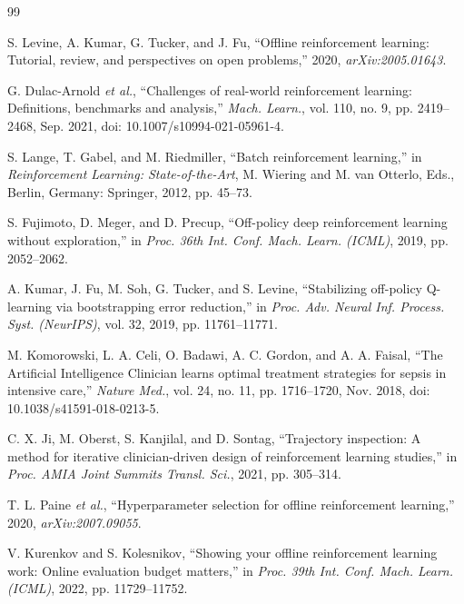 \documentclass[journal]{IEEEtran}
\begin{document}
\begin{thebibliography}{99}

S. Levine, A. Kumar, G. Tucker, and J. Fu, ``Offline reinforcement learning: Tutorial, review, and perspectives on open problems,'' 2020, \emph{arXiv:2005.01643}.

G. Dulac-Arnold \emph{et al.}, ``Challenges of real-world reinforcement learning: Definitions, benchmarks and analysis,'' \emph{Mach. Learn.}, vol. 110, no. 9, pp. 2419--2468, Sep. 2021, doi: 10.1007/s10994-021-05961-4.

S. Lange, T. Gabel, and M. Riedmiller, ``Batch reinforcement learning,'' in \emph{Reinforcement Learning: State-of-the-Art}, M. Wiering and M. van Otterlo, Eds., Berlin, Germany: Springer, 2012, pp. 45--73.

S. Fujimoto, D. Meger, and D. Precup, ``Off-policy deep reinforcement learning without exploration,'' in \emph{Proc. 36th Int. Conf. Mach. Learn. (ICML)}, 2019, pp. 2052--2062.

A. Kumar, J. Fu, M. Soh, G. Tucker, and S. Levine, ``Stabilizing off-policy Q-learning via bootstrapping error reduction,'' in \emph{Proc. Adv. Neural Inf. Process. Syst. (NeurIPS)}, vol. 32, 2019, pp. 11761--11771.

M. Komorowski, L. A. Celi, O. Badawi, A. C. Gordon, and A. A. Faisal, ``The Artificial Intelligence Clinician learns optimal treatment strategies for sepsis in intensive care,'' \emph{Nature Med.}, vol. 24, no. 11, pp. 1716--1720, Nov. 2018, doi: 10.1038/s41591-018-0213-5.

C. X. Ji, M. Oberst, S. Kanjilal, and D. Sontag, ``Trajectory inspection: A method for iterative clinician-driven design of reinforcement learning studies,'' in \emph{Proc. AMIA Joint Summits Transl. Sci.}, 2021, pp. 305--314.

T. L. Paine \emph{et al.}, ``Hyperparameter selection for offline reinforcement learning,'' 2020, \emph{arXiv:2007.09055}.

V. Kurenkov and S. Kolesnikov, ``Showing your offline reinforcement learning work: Online evaluation budget matters,'' in \emph{Proc. 39th Int. Conf. Mach. Learn. (ICML)}, 2022, pp. 11729--11752.


\end{thebibliography}
\end{document}
